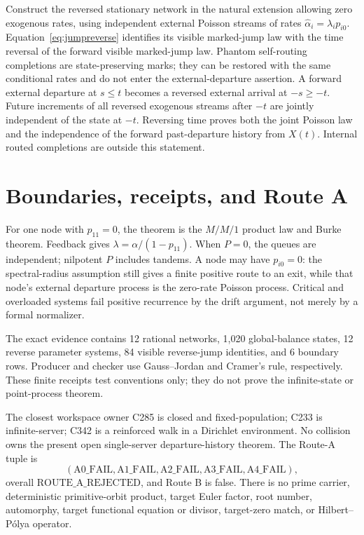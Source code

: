 \documentclass[10pt]{article}
\begin{document}
Construct the reversed stationary network in the natural extension allowing zero exogenous rates,
using independent external Poisson streams of rates
\(\widehat\alpha_i=\lambda_ip_{i0}\). Equation~\eqref{eq:jumpreverse}
identifies its visible marked-jump law with the time reversal of the forward
visible marked-jump law. Phantom self-routing completions are state-preserving
marks; they can be restored with the same conditional rates and do not enter
the external-departure assertion. A forward external departure at
\(s\le t\) becomes a reversed external arrival at \(-s\ge-t\). Future
increments of all reversed exogenous streams after \(-t\) are jointly
independent of the state at \(-t\). Reversing time proves both the joint
Poisson law and the independence of the forward past-departure history from
\(X(t)\). Internal routed completions are outside this statement.

\section{Boundaries, receipts, and Route A}
For one node with \(p_{11}=0\), the theorem is the \(M/M/1\) product law and
Burke theorem. Feedback gives \(\lambda=\alpha/(1-p_{11})\). When \(P=0\),
the queues are independent; nilpotent \(P\) includes tandems. A node may have
\(p_{i0}=0\): the spectral-radius assumption still gives a finite positive
route to an exit, while that node's external departure process is the
zero-rate Poisson process. Critical and overloaded systems fail positive
recurrence by the drift argument, not merely by a formal normalizer.

The exact evidence contains 12 rational networks, 1,020 global-balance states,
12 reverse parameter systems, 84 visible reverse-jump identities, and 6
boundary rows. Producer and checker use Gauss--Jordan and Cramer's rule,
respectively. These finite receipts test conventions only; they do not prove
the infinite-state or point-process theorem.

The closest workspace owner C285 is closed and fixed-population; C233 is
infinite-server; C342 is a reinforced walk in a Dirichlet environment. No
collision owns the present open single-server departure-history theorem. The
Route-A tuple is
\[
(\mathrm{A0\_FAIL},\mathrm{A1\_FAIL},\mathrm{A2\_FAIL},
 \mathrm{A3\_FAIL},\mathrm{A4\_FAIL}),
\]
overall \(\mathrm{ROUTE\_A\_REJECTED}\), and Route B is false. There is no
prime carrier, deterministic primitive-orbit product, target Euler factor,
root number, automorphy, target functional equation or divisor, target-zero
match, or Hilbert--Pólya operator.
\end{document}
